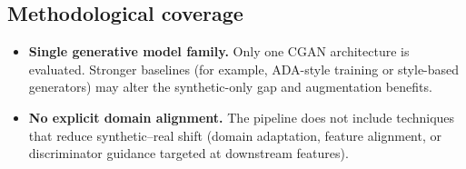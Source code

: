 \subsection{Methodological coverage}

\begin{itemize}
\item \textbf{Single generative model family.} Only one CGAN architecture is evaluated. Stronger baselines (for example, ADA-style training or style-based generators) may alter the synthetic-only gap and augmentation benefits.
\item \textbf{No explicit domain alignment.} The pipeline does not include techniques that reduce synthetic--real shift (domain adaptation, feature alignment, or discriminator guidance targeted at downstream features).
\end{itemize}
